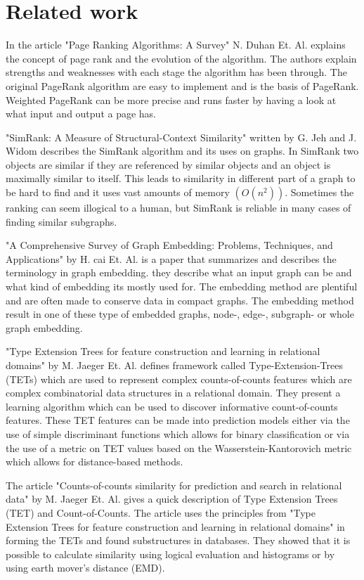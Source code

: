 \section{Related work}
In the article "Page Ranking Algorithms: A Survey" N. Duhan Et. Al.\cite{4809246} explains the concept of page rank and the evolution of the algorithm. The authors explain strengths and weaknesses with each stage the algorithm has been through. The original PageRank algorithm are easy to implement and is the basis of PageRank. Weighted PageRank can be more precise and runs faster by having a look at what input and output a page has.

"SimRank: A Measure of Structural-Context Similarity" written by G. Jeh and J. Widom\cite{10.1145/775047.775126} describes the SimRank algorithm and its uses on graphs. In SimRank two objects are similar if they are referenced by similar objects and an object is maximally similar to itself. This leads to similarity in different part of a graph to be hard to find and it uses vast amounts of memory $(O(n^2))$. Sometimes the ranking can seem illogical to a human, but SimRank is reliable in many cases of finding similar subgraphs.

"A Comprehensive Survey of Graph Embedding: Problems, Techniques, and Applications" by H. cai Et. Al.\cite{8294302} is a paper that summarizes and describes the terminology in graph embedding. they describe what an input graph can be and what kind of embedding its mostly used for. The embedding method are plentiful and are often made to conserve data in compact graphs. The embedding method result in one of these type of embedded graphs, node-, edge-, subgraph- or whole graph embedding.

"Type Extension Trees for feature construction and learning in relational domains" by M. Jaeger Et. Al. \cite{JAEGER201330} defines framework called Type-Extension-Trees (TETs) which are used to represent complex counts-of-counts features which are complex combinatorial data structures in a relational domain. They present a learning algorithm which can be used to discover informative count-of-counts features. These TET features can be made into prediction models either via the use of simple discriminant functions which allows for binary classification or via the use of a metric on TET values based on the Wasserstein-Kantorovich metric which allows for distance-based methods.

The article "Counts-of-counts similarity for prediction and search in relational data" by M. Jaeger Et. Al.\cite{jaeger2019counts}  gives a quick description of Type Extension Trees (TET) and Count-of-Counts. The article uses the principles from "Type Extension Trees for feature construction and learning in relational domains" in forming the TETs and found substructures in databases. They showed that it is possible to calculate similarity using logical evaluation and histograms or by using earth mover’s distance (EMD).

